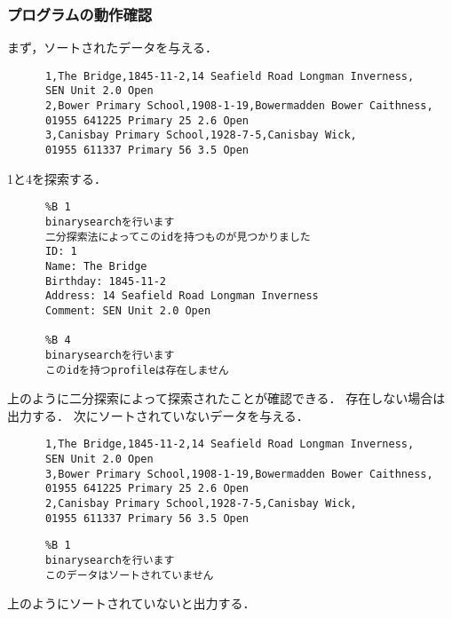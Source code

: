     \subsubsection{プログラムの動作確認}
    まず，ソートされたデータを与える．
    \begin{verbatim}
      1,The Bridge,1845-11-2,14 Seafield Road Longman Inverness,
      SEN Unit 2.0 Open
      2,Bower Primary School,1908-1-19,Bowermadden Bower Caithness,
      01955 641225 Primary 25 2.6 Open
      3,Canisbay Primary School,1928-7-5,Canisbay Wick,
      01955 611337 Primary 56 3.5 Open
    \end{verbatim}
    1と4を探索する．
    \begin{verbatim}
      %B 1
      binarysearchを行います
      二分探索法によってこのidを持つものが見つかりました
      ID: 1
      Name: The Bridge
      Birthday: 1845-11-2
      Address: 14 Seafield Road Longman Inverness
      Comment: SEN Unit 2.0 Open

      %B 4
      binarysearchを行います
      このidを持つprofileは存在しません
    \end{verbatim}
    上のように二分探索によって探索されたことが確認できる．
    存在しない場合は出力する．
    次にソートされていないデータを与える．
    \begin{verbatim}
      1,The Bridge,1845-11-2,14 Seafield Road Longman Inverness,
      SEN Unit 2.0 Open
      3,Bower Primary School,1908-1-19,Bowermadden Bower Caithness,
      01955 641225 Primary 25 2.6 Open
      2,Canisbay Primary School,1928-7-5,Canisbay Wick,
      01955 611337 Primary 56 3.5 Open
    \end{verbatim}
    \begin{verbatim}
      %B 1
      binarysearchを行います
      このデータはソートされていません
    \end{verbatim}
    上のようにソートされていないと出力する．

